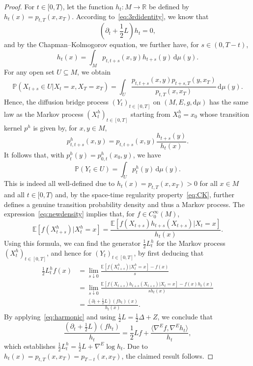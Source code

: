 \documentclass[10pt]{amsart}
\theoremstyle{remark}
\newcommand{\pp}{\mathbb{P}}
\newcommand{\R}{\mathbb{R}}
\newcommand{\dd}{\,{\mathrm d}}
\newcommand{\db}{{\mathrm d}}
\numberwithin{equation}{section}
\begin{document}
\begin{proof}
    For $t\in[0,T)$, let the function $h_t\colon M\to\R$ be defined by $h_t(x) = p_{t,T}(x, x_T)$.
    According to~\eqref{eq:3rdidentity}, we know that
    \begin{equation}\label{eq:harmonic}
        \left(\partial_t + \frac{1}{2} L\right)h_t = 0,
    \end{equation}
    and by the Chapman–Kolmogorov equation, we further have, for $s\in(0,T-t)$,
    \begin{equation}\label{eq:CK}
        h_t(x) = \int_M p_{t,t+s}(x,y) h_{t+s}(y)\dd\mu(y).
    \end{equation}
    For any open set $U\subseteq M$, we obtain
    \begin{displaymath}
        \pp\left(X_{t+s}\in U|X_t=x,X_T=x_T\right)
        =\int_U\frac{p_{t,t+s}(x,y)p_{t+s,T}(y,x_T)}{p_{t,T}(x,x_T)}\dd\mu(y).
    \end{displaymath}
    Hence, the diffusion bridge process $(Y_t)_{t\in[0,T]}$ on $(M,E,g,\db\mu)$ has the same law as the Markov process $(X_t^h)_{t\in[0,T]}$ starting from $X_0^h = x_0$ whose transition kernel $p^h$ is given by, for $x,y\in M$,
    \begin{equation}\label{eq:newdensity}
        p_{t,t+s}^h(x,y) = p_{t,t+s}(x,y) \frac{h_{t+s}(y)}{h_t(x)}.
    \end{equation}
    It follows that, with $p_t^h(y) = p_{0,t}^h(x_0, y)$, we have
    $$\pp(Y_t \in U) = \int_U p_t^h(y) \dd\mu(y).$$
    This is indeed all well-defined due to $h_t(x)=p_{t,T}(x,x_T)>0$ for all $x\in M$ and all $t\in[0,T)$ 
    and, by the space-time regularity property~\eqref{eq:CK}, further defines a genuine transition probability density and thus a Markov process.
    The expression~\eqref{eq:newdensity} implies that, for $f\in C^\infty_0(M)$,
    \begin{displaymath}
        \mathbb{E}[f(X_{t+s}^h)|X_t^h =x]
        = \frac{\mathbb{E}[f(X_{t+s}) h_{t+s}(X_{t+s})| X_t =x]}{h_t(x)}.
    \end{displaymath}
    Using this formula, we can find the generator $\frac{1}{2} L^h_t$ for the Markov process $(X_t^h)_{t\in[0,T]}$, and hence for $(Y_t)_{t\in[0,T]}$, by first deducing that
    \begin{align*}
    \frac{1}{2}L^h_t f(x)
    & = \lim_{s \downarrow 0} \frac{\mathbb{E}[f(X_{t+s}^h)| X_t^h = x] -f(x)}{s} \\
    & = \lim_{s \downarrow 0} \frac{\mathbb{E}[f(X_{t+s})h_{t+s}(X_{t+s})| X_t = x] -f(x)h_t(x)}{s h_t(x)} \\ 
    & = \frac{(\partial_t+\frac{1}{2}L) (f h_t)(x)}{h_t(x)}.
    \end{align*}
    By applying~\eqref{eq:harmonic} and using $\frac{1}{2}L=\frac{1}{2}\Delta +Z$, we conclude that
    \begin{displaymath}
        \frac{(\partial_t+\frac{1}{2}L) (f h_t)}{h_t}
        =\frac{1}{2}Lf+ \frac{\langle \nabla^E f, \nabla^E h_t \rangle}{h_t},
    \end{displaymath}
    which establishes $\frac{1}{2}L^h_t = \frac{1}{2}L + \nabla^E \log h_t$. Due to $h_t(x) = p_{t,T}(x, x_T)=p_{T-t}(x,x_T)$, the claimed result follows.
\end{proof}
\end{document}
